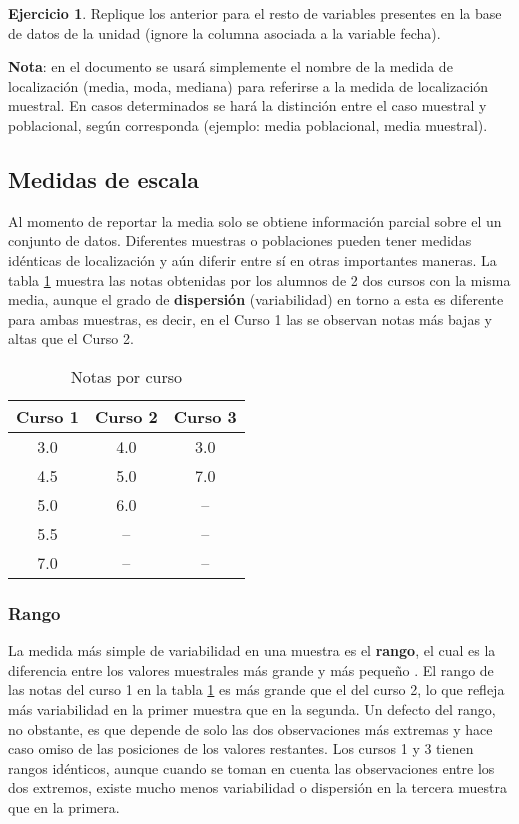 \documentclass[
]{book}
\theoremstyle{definition}
\theoremstyle{definition}
\theoremstyle{definition}
\newtheorem{exercise}{Ejercicio}[chapter]
\theoremstyle{definition}
\theoremstyle{remark}
\begin{document}
\begin{exercise}
Replique los anterior para el resto de variables presentes en la base de datos de la unidad (ignore la columna asociada a la variable fecha).
\end{exercise}

\textbf{Nota}: en el documento se usará simplemente el nombre de la medida de localización (media, moda, mediana) para referirse a la medida de localización muestral. En casos determinados se hará la distinción entre el caso muestral y poblacional, según corresponda (ejemplo: media poblacional, media muestral).

\hypertarget{medidas-de-escala}{%
\subsection{Medidas de escala}\label{medidas-de-escala}}

Al momento de reportar la media solo se obtiene información parcial sobre el un conjunto de datos. Diferentes muestras o poblaciones pueden tener medidas idénticas de localización y aún diferir entre sí en otras importantes maneras. La tabla \ref{tab:variabilidad} muestra las notas obtenidas por los alumnos de 2 dos cursos con la misma media, aunque el grado de \textbf{dispersión} (variabilidad) en torno a esta es diferente para ambas muestras, es decir, en el Curso 1 las se observan notas más bajas y altas que el Curso 2.

\begin{table}[H]

\caption{\label{tab:variabilidad}Notas por curso}
\centering
\begin{tabular}[t]{ccc}
\toprule
Curso 1 & Curso 2 & Curso 3\\
\midrule
3.0 & 4.0 & 3.0\\
4.5 & 5.0 & 7.0\\
5.0 & 6.0 & --\\
5.5 & -- & --\\
7.0 & -- & --\\
\bottomrule
\end{tabular}
\end{table}

\hypertarget{rango}{%
\subsubsection*{Rango}\label{rango}}

La medida más simple de variabilidad en una muestra es el \textbf{rango}, el cual es la diferencia entre los valores muestrales más grande y más pequeño \citep[página 32]{Devore}. El rango de las notas del curso 1 en la tabla \ref{tab:variabilidad} es más grande que el del curso 2, lo que refleja más variabilidad en la primer muestra que en la segunda. Un defecto del rango, no obstante, es que depende de solo las dos observaciones más extremas y hace caso omiso de las posiciones de los valores restantes. Los cursos 1 y 3 tienen rangos idénticos, aunque cuando se toman en cuenta las observaciones entre los dos extremos, existe mucho menos variabilidad o dispersión en la tercera muestra que en la primera.
\end{document}
